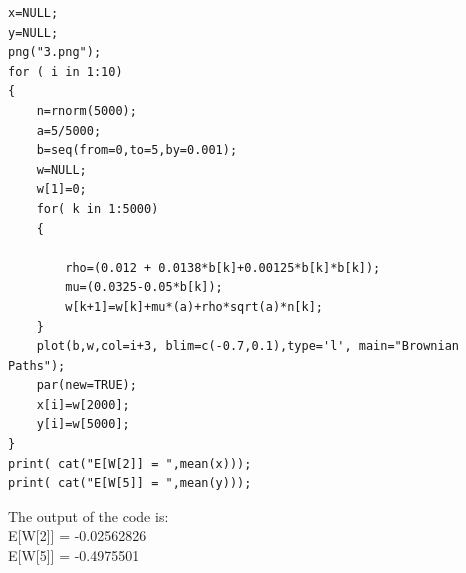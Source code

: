 \documentclass[12pt]{book}
\begin{document}

\begin{lstlisting}
x=NULL;
y=NULL;
png("3.png");
for ( i in 1:10)
{
	n=rnorm(5000);
	a=5/5000;
	b=seq(from=0,to=5,by=0.001);
	w=NULL;
	w[1]=0;
	for( k in 1:5000)
	{
		
		rho=(0.012 + 0.0138*b[k]+0.00125*b[k]*b[k]);
		mu=(0.0325-0.05*b[k]);
		w[k+1]=w[k]+mu*(a)+rho*sqrt(a)*n[k];
	}
	plot(b,w,col=i+3, blim=c(-0.7,0.1),type='l', main="Brownian Paths");
	par(new=TRUE);
	x[i]=w[2000];
	y[i]=w[5000];
}
print( cat("E[W[2]] = ",mean(x)));
print( cat("E[W[5]] = ",mean(y)));
\end{lstlisting}
\newpage
The output of the code is:\\
E[W[2]] =  -0.02562826\\
E[W[5]] =  -0.4975501 

\begin{figure}[H]
	\centering
\end{figure}
\end{document}
